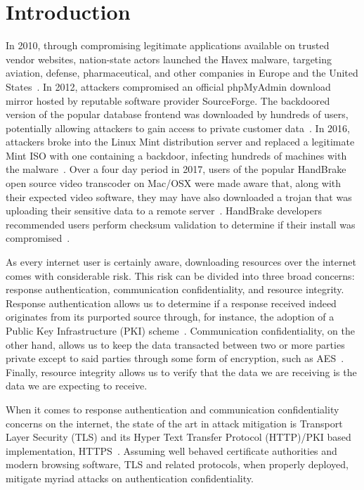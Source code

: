 \section{Introduction} \label{sec:introduction}

In 2010, through compromising legitimate applications available on trusted
vendor websites, nation-state actors launched the Havex malware, targeting
aviation, defense, pharmaceutical, and other companies in Europe and the United
States~\cite{SCA-HAVEX1, SCA-HAVEX2}. In 2012, attackers compromised an official
phpMyAdmin download mirror hosted by reputable software provider SourceForge.
The backdoored version of the popular database frontend was downloaded by
hundreds of users, potentially allowing attackers to gain access to private
customer data~\cite{SCA-PMA1, SCA-PMA2}. In 2016, attackers broke into the Linux
Mint distribution server and replaced a legitimate Mint ISO with one containing
a backdoor, infecting hundreds of machines with the malware~\cite{SCA-MINT1,
SCA-MINT2}. Over a four day period in 2017, users of the popular HandBrake open
source video transcoder on Mac/OSX were made aware that, along with their
expected video software, they may have also downloaded a trojan that was
uploading their sensitive data to a remote server~\cite{SCA-HB1}. HandBrake
developers recommended users perform checksum validation to determine if their
install was compromised~\cite{SCA-HB2}.

As every internet user is certainly aware, downloading resources over the
internet comes with considerable risk. This risk can be divided into three broad
concerns: response authentication, communication confidentiality, and resource
integrity. Response authentication allows us to determine if a response received
indeed originates from its purported source through,
for instance, the adoption of a Public Key Infrastructure (PKI)
scheme~\cite{PKI}. Communication confidentiality, on the other hand, allows us
to keep the data transacted between two or more parties private except to said
parties through some form of encryption, such as
AES~\cite{AES}. Finally, resource integrity allows us to verify that the data we
are receiving is the data we are expecting to receive.

When it comes to response authentication and communication confidentiality
concerns on the internet, the state of the art in attack mitigation is Transport
Layer Security (TLS) and its Hyper Text Transfer Protocol (HTTP)/PKI based
implementation, HTTPS~\cite{TLS1.2, TLS1, TLS0, HTTPS, PKI}. Assuming well
behaved certificate authorities and modern browsing software, TLS and related
protocols, when properly deployed, mitigate myriad attacks on authentication
confidentiality.

